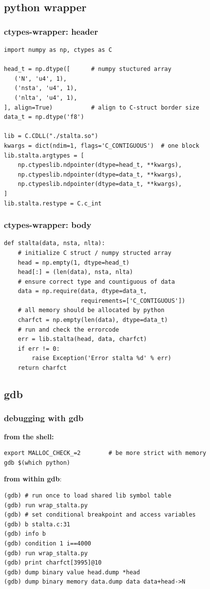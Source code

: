 \documentclass[utf8, compress, hyperref={pdftex=true,pdfpagemode=FullScreen}, graphicx={pdftex}]{beamer}
\begin{document}
\subsection[wrapper]{python wrapper}
\label{wrap}
\begin{frame}[fragile]
    \frametitle{ctypes-wrapper: header}
    \begin{lstlisting}
import numpy as np, ctypes as C

head_t = np.dtype([      # numpy stuctured array
   ('N', 'u4', 1),
   ('nsta', 'u4', 1),
   ('nlta', 'u4', 1),
], align=True)           # align to C-struct border size
data_t = np.dtype('f8')

lib = C.CDLL("./stalta.so")
kwargs = dict(ndim=1, flags='C_CONTIGUOUS')  # one block
lib.stalta.argtypes = [
    np.ctypeslib.ndpointer(dtype=head_t, **kwargs),
    np.ctypeslib.ndpointer(dtype=data_t, **kwargs),
    np.ctypeslib.ndpointer(dtype=data_t, **kwargs),
]
lib.stalta.restype = C.c_int
    \end{lstlisting}
\end{frame}

\begin{frame}[fragile]
    \frametitle{ctypes-wrapper: body}
    \begin{lstlisting}
def stalta(data, nsta, nlta):
    # initialize C struct / numpy structed array
    head = np.empty(1, dtype=head_t)
    head[:] = (len(data), nsta, nlta)
    # ensure correct type and countiguous of data
    data = np.require(data, dtype=data_t,
                      requirements=['C_CONTIGUOUS'])
    # all memory should be allocated by python
    charfct = np.empty(len(data), dtype=data_t)
    # run and check the errorcode
    err = lib.stalta(head, data, charfct)
    if err != 0:
        raise Exception('Error stalta %d' % err)
    return charfct
    \end{lstlisting}
\end{frame}


\subsection{gdb}
\begin{frame}[fragile]
    \frametitle{debugging with gdb}
    \textbf{from the shell:}
    \begin{lstlisting}
export MALLOC_CHECK_=2        # be more strict with memory
gdb $(which python)
    \end{lstlisting}

    \textbf{from within gdb}:
    \begin{lstlisting}
(gdb) # run once to load shared lib symbol table
(gdb) run wrap_stalta.py
(gdb) # set conditional breakpoint and access variables
(gdb) b stalta.c:31
(gdb) info b
(gdb) condition 1 i==4000
(gdb) run wrap_stalta.py
(gdb) print charfct[3995]@10
(gdb) dump binary value head.dump *head
(gdb) dump binary memory data.dump data data+head->N
    \end{lstlisting}
\end{frame}
\end{document}

